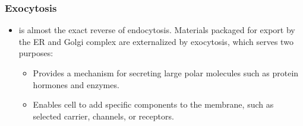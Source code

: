 \documentclass{article}
\numberwithin{equation}{section}
\begin{document}
\subsubsection{Exocytosis}
\begin{itemize}
    \item {} is almost the exact reverse of endocytosis. Materials packaged for export by the ER and Golgi complex are externalized by exocytosis, which serves two purposes:
    \begin{itemize}
        \item Provides a mechanism for secreting large polar molecules such as protein hormones and enzymes.
        \item Enables cell to add specific components to the membrane, such as selected carrier, channels, or receptors.
    \end{itemize}
\end{itemize}
\end{document}
